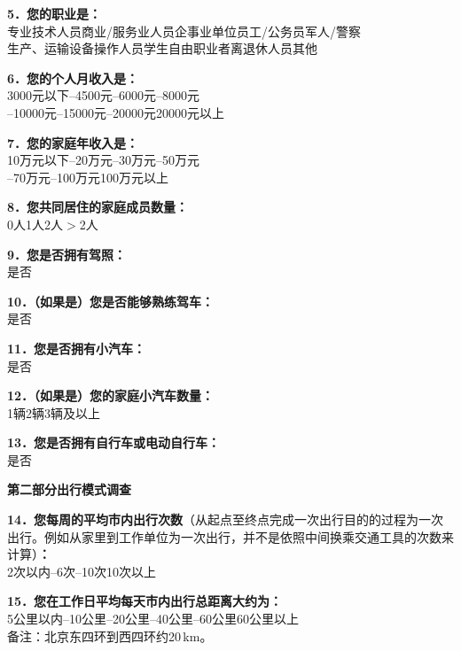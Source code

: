 \noindent\textbf{5．您的职业是：}\\
\qbox 专业技术人员\quad \qbox 商业/服务业人员\quad \qbox 企事业单位员工/公务员\quad \qbox 军人/警察\\
\qbox 生产、运输设备操作人员\quad \qbox 学生\quad \qbox 自由职业者\quad \qbox 离退休人员\quad \qbox 其他

\noindent\textbf{6．您的个人月收入是：}\\
\qbox 3000元以下\quad {}--4500元\quad {}--6000元\quad {}--8000元\\
--10000元\quad {}--15000元\quad {}--20000元\quad \qbox 20000元以上

\noindent\textbf{7．您的家庭年收入是：}\\
\qbox 10万元以下\quad {}--20万元\quad {}--30万元\quad {}--50万元\\
--70万元\quad {}--100万元\quad \qbox 100万元以上

\noindent\textbf{8．您共同居住的家庭成员数量：}\\
\qbox 0人\quad \qbox 1人\quad \qbox 2人\quad \qbox $>$2人

\noindent\textbf{9．您是否拥有驾照：}\\
\qbox 是\quad \qbox 否

\noindent\textbf{10．（如果是）您是否能够熟练驾车：}\\
\qbox 是\quad \qbox 否

\noindent\textbf{11．您是否拥有小汽车：}\\
\qbox 是\quad \qbox 否

\noindent\textbf{12．（如果是）您的家庭小汽车数量：}\\
\qbox 1辆\quad \qbox 2辆\quad \qbox 3辆及以上

\noindent\textbf{13．您是否拥有自行车或电动自行车：}\\
\qbox 是\quad \qbox 否

\vspace{0.6em}
\noindent\textbf{第二部分\quad 出行模式调查}

\noindent\textbf{14．您每周的平均市内出行次数}（从起点至终点完成一次出行目的的过程为一次出行。例如从家里到工作单位为一次出行，并不是依照中间换乘交通工具的次数来计算）\textbf{：}\\
\qbox 2次以内\quad {}--6次\quad {}--10次\quad \qbox 10次以上

\noindent\textbf{15．您在工作日平均每天市内出行总距离大约为：}\\
\qbox 5公里以内\quad {}--10公里\quad {}--20公里\quad {}--40公里\quad {}--60公里\quad \qbox 60公里以上\\
{\footnotesize 备注：北京东四环到西四环约20\,km。}

